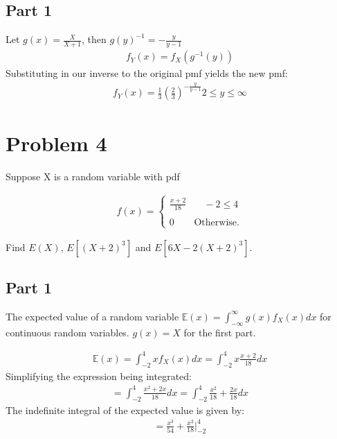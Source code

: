 \documentclass{article}
\begin{document}
\subsection*{Part 1}
Let $g(x)=\frac{X}{X+1}$, then $g(y)^{-1}=-\frac{y}{y-1}$
\begin{align*}
f_Y(x) = f_X(g^{-1}(y))
\end{align*}
Substituting in our inverse to the original pmf yields the new pmf:
\begin{align*}
\boxed{f_Y(x) = \frac{1}{3}(\frac{2}{3})^{-\frac{y}{y-1}} } 2\leq y \leq \infty
\end{align*}

\clearpage


\section*{Problem 4}
Suppose X is a random variable with pdf

\begin{align*}
f(x) = \left\{
        \begin{array}{ll}
            \tfrac{x+2}{18} & \quad -2 \leq 4 \\
            \\
            0 & \text{Otherwise.}
        \end{array}
    \right.
\end{align*}

Find $E(X)$, $E[(X+2)^3]$ and $E[6X-2(X+2)^3]$.

\subsection*{Part 1}
The expected value of a random variable $\mathbb{E}(x)=\int_{-\infty}^{\infty} g(x)f_X(x) dx$ for continuous random variables. $g(x)=X$ for the first part.

\begin{align*}
\mathbb{E}(x)=\int_{-2}^{4} x f_X(x) dx = \int_{-2}^{4} x \tfrac{x+2}{18} dx
\end{align*}
Simplifying the expression being integrated:
\begin{align*}
=\int_{-2}^{4} \tfrac{x^2+2x}{18} dx = \int_{-2}^{4} \tfrac{x^2}{18}+\tfrac{2x}{18} dx
\end{align*}
The indefinite integral of the expected value is given by:
\begin{align*}
=\frac{x^3}{54}+\frac{x^2}{18}|_{-2}^{4}
\end{align*}
\end{document}

